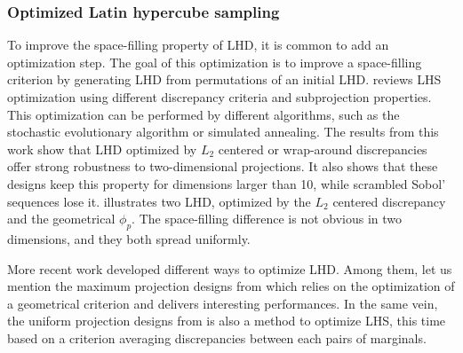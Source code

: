 \subsubsection{Optimized Latin hypercube sampling}
To improve the space-filling property of LHD, it is common to add an optimization step. 
The goal of this optimization is to improve a space-filling criterion by generating LHD from permutations of an initial LHD. 
\citet{damblin_couplet_2013} reviews LHS optimization using different discrepancy criteria and subprojection properties. 
This optimization can be performed by different algorithms, such as the stochastic evolutionary algorithm or simulated annealing. 
The results from this work show that LHD optimized by $L_2$ centered or wrap-around discrepancies offer strong robustness to two-dimensional projections. 
It also shows that these designs keep this property for dimensions larger than 10, while scrambled Sobol' sequences lose it. 
 illustrates two LHD, optimized by the $L_2$ centered discrepancy and the geometrical $\phi_p$. 
The space-filling difference is not obvious in two dimensions, and they both spread uniformly.    

More recent work developed different ways to optimize LHD. 
Among them, let us mention the maximum projection designs from \citet{joseph_gul_2015} which relies on the optimization of a geometrical criterion and delivers interesting performances. 
In the same vein, the uniform projection designs from \citet{sun_2019} is also a method to optimize LHS, this time based on a criterion averaging discrepancies between each pairs of marginals.

